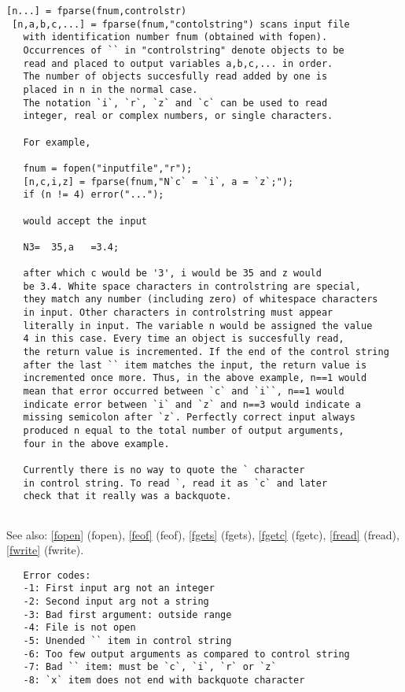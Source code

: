 \documentclass[a4paper]{article}
\begin{document}
\begin{tscreen}
\begin{verbatim}
[n...] = fparse(fnum,controlstr)
 [n,a,b,c,...] = fparse(fnum,"contolstring") scans input file
   with identification number fnum (obtained with fopen).
   Occurrences of `` in "controlstring" denote objects to be
   read and placed to output variables a,b,c,... in order.
   The number of objects succesfully read added by one is
   placed in n in the normal case.
   The notation `i`, `r`, `z` and `c` can be used to read
   integer, real or complex numbers, or single characters.

   For example,

   fnum = fopen("inputfile","r");
   [n,c,i,z] = fparse(fnum,"N`c` = `i`, a = `z`;");
   if (n != 4) error("...");

   would accept the input

   N3=  35,a   =3.4;

   after which c would be '3', i would be 35 and z would
   be 3.4. White space characters in controlstring are special,
   they match any number (including zero) of whitespace characters
   in input. Other characters in controlstring must appear
   literally in input. The variable n would be assigned the value
   4 in this case. Every time an object is succesfully read,
   the return value is incremented. If the end of the control string
   after the last `` item matches the input, the return value is
   incremented once more. Thus, in the above example, n==1 would
   mean that error occurred between `c` and `i``, n==1 would
   indicate error between `i` and `z` and n==3 would indicate a
   missing semicolon after `z`. Perfectly correct input always
   produced n equal to the total number of output arguments,
   four in the above example.

   Currently there is no way to quote the ` character
   in control string. To read `, read it as `c` and later
   check that it really was a backquote.
   
\end{verbatim}

See also: \ref{fopen} {(fopen)}, \ref{feof} {(feof)}, \ref{fgets} {(fgets)}, \ref{fgetc} {(fgetc)}, \ref{fread} {(fread)}, \ref{fwrite} {(fwrite)}.
\begin{verbatim}
   Error codes:
   -1: First input arg not an integer
   -2: Second input arg not a string
   -3: Bad first argument: outside range
   -4: File is not open
   -5: Unended `` item in control string
   -6: Too few output arguments as compared to control string
   -7: Bad `` item: must be `c`, `i`, `r` or `z`
   -8: `x` item does not end with backquote character
\end{verbatim}
\end{tscreen}
\end{document}
